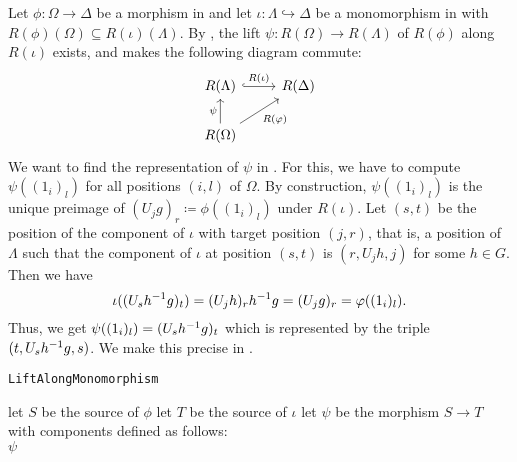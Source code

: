 \begin{rem}
Let $\phi\colon \Omega \to \Delta$ be a morphism in \SkeletalGSets{} and let $\iota\colon \Lambda \hookrightarrow \Delta$ be a monomorphism in \SkeletalGSets{} with $R(\phi)(\Omega) \subseteq R(\iota)(\Lambda)$. By , the lift $\psi\colon R(\Omega) \to R(\Lambda)$ of $R(\phi)$ along $R(\iota)$ exists, and makes the following diagram commute:
\[
\begin{tikzcd}
R(\Lambda) \arrow[r, "R(\iota)", hook]             & R(\Delta) \\
R(\Omega) \arrow[ru, "R(\phi)"'] \arrow[u, "\psi"] &       
\end{tikzcd}
\]
We want to find the representation of $\psi$ in \SkeletalGSets{}. For this, we have to compute $\psi((1_i)_l)$ for all positions $(i,l)$ of $\Omega$. By construction, $\psi((1_i)_l)$ is the unique preimage of $(U_jg)_r \coloneqq \phi((1_i)_l)$ under $R(\iota)$. Let $(s,t)$ be the position of the component of $\iota$ with target position $(j,r)$, that is, a position of $\Lambda$ such that the component of $\iota$ at position $(s,t)$ is $(r,U_jh,j)$ for some $h \in G$. Then we have \[\iota((U_sh^{-1} g)_t) = (U_jh)_rh^{-1} g = (U_jg)_r = \varphi((1_i)_l).\] Thus, we get $\psi((1_i)_l) = (U_sh^{-1} g)_t$ which is represented by the triple $(t,U_sh^{-1} g,s)$. We make this precise in .
\end{rem}

\begin{algorithm}\capstart
    \caption{\texttt{LiftAlongMonomorphism}}\label{algo:LiftAlongMonomorphism}
	\BlankLine
	let $S$ be the source of $\phi$\;
	let $T$ be the source of $\iota$\;
    \BlankLine
    let $\psi$ be the morphism $S \to T$ with components defined as follows:\\
	\BlankLine
	\Return $\psi$\;
\end{algorithm}

